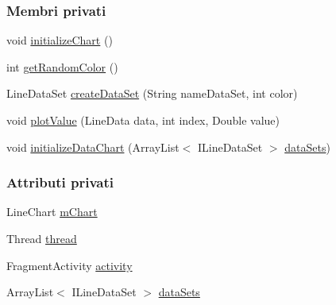 \subsubsection*{Membri privati}
\begin{DoxyCompactItemize}
\item 
void \hyperlink{classit_1_1unibo_1_1torsello_1_1bluetoothpositioning_1_1util_1_1ChartUtil_aab1a6bd41cbf8228c53d633af6b89bb7_aab1a6bd41cbf8228c53d633af6b89bb7}{initialize\+Chart} ()
\item 
int \hyperlink{classit_1_1unibo_1_1torsello_1_1bluetoothpositioning_1_1util_1_1ChartUtil_ac7dc0a849201a4a3c932fd525435b397_ac7dc0a849201a4a3c932fd525435b397}{get\+Random\+Color} ()
\item 
Line\+Data\+Set \hyperlink{classit_1_1unibo_1_1torsello_1_1bluetoothpositioning_1_1util_1_1ChartUtil_a7e24ac167fd4955090e04024b11c6c31_a7e24ac167fd4955090e04024b11c6c31}{create\+Data\+Set} (String name\+Data\+Set, int color)
\item 
void \hyperlink{classit_1_1unibo_1_1torsello_1_1bluetoothpositioning_1_1util_1_1ChartUtil_a86398d4aca978fbfc10c71039191635e_a86398d4aca978fbfc10c71039191635e}{plot\+Value} (Line\+Data data, int index, Double value)
\item 
void \hyperlink{classit_1_1unibo_1_1torsello_1_1bluetoothpositioning_1_1util_1_1ChartUtil_a3393d9aa353849188c02a63d64f2dd2d_a3393d9aa353849188c02a63d64f2dd2d}{initialize\+Data\+Chart} (Array\+List$<$ I\+Line\+Data\+Set $>$ \hyperlink{classit_1_1unibo_1_1torsello_1_1bluetoothpositioning_1_1util_1_1ChartUtil_aa98bcaa2d5ba444b91cdc029768d380a_aa98bcaa2d5ba444b91cdc029768d380a}{data\+Sets})
\end{DoxyCompactItemize}
\subsubsection*{Attributi privati}
\begin{DoxyCompactItemize}
\item 
Line\+Chart \hyperlink{classit_1_1unibo_1_1torsello_1_1bluetoothpositioning_1_1util_1_1ChartUtil_a60b5bd6796cc5dcde12d9a6bb3e67c86_a60b5bd6796cc5dcde12d9a6bb3e67c86}{m\+Chart}
\item 
Thread \hyperlink{classit_1_1unibo_1_1torsello_1_1bluetoothpositioning_1_1util_1_1ChartUtil_ac73af861c9ca49e226fe1218cef6c572_ac73af861c9ca49e226fe1218cef6c572}{thread}
\item 
Fragment\+Activity \hyperlink{classit_1_1unibo_1_1torsello_1_1bluetoothpositioning_1_1util_1_1ChartUtil_acf9c1988f7aaacc3f3354ac7e9eeef6a_acf9c1988f7aaacc3f3354ac7e9eeef6a}{activity}
\item 
Array\+List$<$ I\+Line\+Data\+Set $>$ \hyperlink{classit_1_1unibo_1_1torsello_1_1bluetoothpositioning_1_1util_1_1ChartUtil_aa98bcaa2d5ba444b91cdc029768d380a_aa98bcaa2d5ba444b91cdc029768d380a}{data\+Sets}
\end{DoxyCompactItemize}



